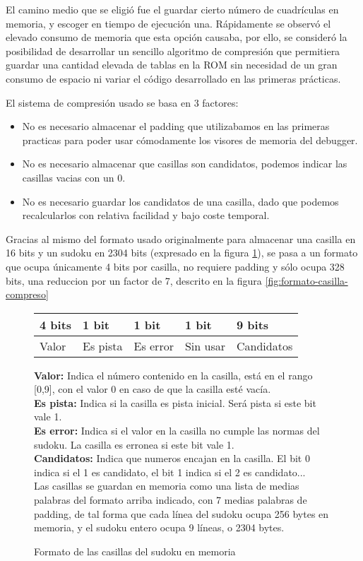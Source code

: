 \documentclass[12pt,letterpaper]{article}
\begin{document}
El camino medio que se eligió fue el guardar cierto número de
cuadrículas en memoria, y escoger en tiempo de ejecución
una. Rápidamente se observó el elevado consumo de memoria que esta
opción causaba, por ello, se consideró la posibilidad de desarrollar
un sencillo algoritmo de compresión que permitiera guardar una
cantidad elevada de tablas en la ROM sin necesidad de un gran consumo
de espacio ni variar el código desarrollado en las primeras prácticas.

El sistema de compresión usado se basa en 3 factores:
\begin{itemize}
  \item No es necesario almacenar el padding que utilizabamos en las
    primeras practicas para poder usar cómodamente los visores de
    memoria del debugger.
  \item No es necesario almacenar que casillas son candidatos, podemos
    indicar las casillas vacias con un 0.
  \item No es necesario guardar los candidatos de una casilla, dado
    que podemos recalcularlos con relativa facilidad y bajo coste
    temporal.
\end{itemize}

Gracias al mismo del formato usado originalmente para almacenar una
casilla en 16 bits y un sudoku en 2304 bits (expresado en la figura
\ref{fig:formato-casilla}), se pasa a un formato que ocupa únicamente
4 bits por casilla, no requiere padding y sólo ocupa 328 bits, una
reduccion por un factor de 7, descrito en la figura
\ref{fig:formato-casilla-compreso}

\begin{figure}
  \begin{center}
    \begin{tabular}{ | p{2cm} | p{2cm} | p{2cm} | p{2cm} | p{4cm} |} \hline
      4 bits & 1 bit    & 1 bit    & 1 bit    & 9 bits     \\\hline
      Valor  & Es pista & Es error & Sin usar & Candidatos \\\hline
    \end{tabular}
  \end{center}
  \textbf{Valor:} Indica el número contenido en la casilla, está en el
  rango [0,9], con el valor 0 en caso de que la casilla esté vacía.\\
  \textbf{Es pista:} Indica si la casilla es pista inicial. Será pista
  si este bit vale 1.\\
  \textbf{Es error:} Indica si el valor en la casilla no cumple las
  normas del sudoku. La casilla es erronea si este bit vale 1.\\
  \textbf{Candidatos:} Indica que numeros encajan en la casilla. El
  bit 0 indica si el 1 es candidato, el bit 1 indica si el 2 es
  candidato...\\
  Las casillas se guardan en memoria como una lista de medias palabras
  del formato arriba indicado, con 7 medias palabras de padding, de
  tal forma que cada línea del sudoku ocupa 256 bytes en memoria, y el
  sudoku entero ocupa 9 líneas, o 2304 bytes.
  \caption{Formato de las casillas del sudoku en memoria}
  \label{fig:formato-casilla}
\end{figure}
\end{document}
